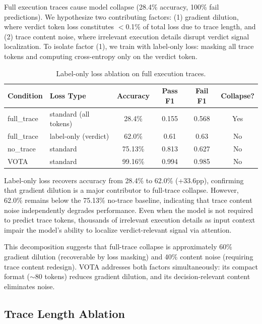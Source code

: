\documentclass[11pt]{article}
\begin{document}
Full execution traces cause model collapse (28.4\% accuracy, 100\% fail predictions). We hypothesize two contributing factors: (1) gradient dilution, where verdict token loss constitutes $<$0.1\% of total loss due to trace length, and (2) trace content noise, where irrelevant execution details disrupt verdict signal localization. To isolate factor (1), we train with label-only loss: masking all trace tokens and computing cross-entropy only on the verdict token.

\begin{table}[h]
\centering
\caption{Label-only loss ablation on full execution traces.}
\label{tab:labelonly}
\begin{tabular}{llcccc}
\toprule
\textbf{Condition} & \textbf{Loss Type} & \textbf{Accuracy} & \textbf{Pass F1} & \textbf{Fail F1} & \textbf{Collapse?} \\
\midrule
full\_trace & standard (all tokens) & 28.4\% & 0.155 & 0.568 & Yes \\
full\_trace & label-only (verdict)  & 62.0\% & 0.61  & 0.63  & No  \\
no\_trace   & standard              & 75.13\% & 0.813 & 0.627 & No  \\
VOTA        & standard              & 99.16\% & 0.994 & 0.985 & No  \\
\bottomrule
\end{tabular}
\end{table}

Label-only loss recovers accuracy from 28.4\% to 62.0\% (+33.6pp), confirming that gradient dilution is a major contributor to full-trace collapse. However, 62.0\% remains below the 75.13\% no-trace baseline, indicating that trace content noise independently degrades performance. Even when the model is not required to predict trace tokens, thousands of irrelevant execution details as input context impair the model's ability to localize verdict-relevant signal via attention.

This decomposition suggests that full-trace collapse is approximately 60\% gradient dilution (recoverable by loss masking) and 40\% content noise (requiring trace content redesign). VOTA addresses both factors simultaneously: its compact format ($\sim$80 tokens) reduces gradient dilution, and its decision-relevant content eliminates noise.

\subsection{Trace Length Ablation}
\label{sec:length}
\end{document}
